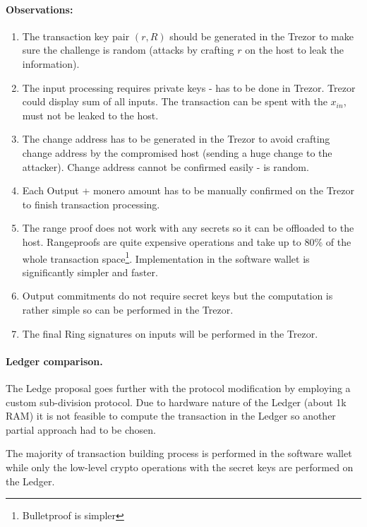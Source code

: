 \documentclass[]{article}
\begin{document}
\paragraph{Observations:}
\begin{enumerate}
	\item The transaction key pair $(r,R)$ should be generated in the Trezor to make sure the challenge is random (attacks by crafting $r$ on the host to leak the information). 
	
	\item The input processing requires private keys - has to be done in Trezor. Trezor could display sum of all inputs. The transaction can be spent with the $x_{in}$, must not be leaked to the host.
	
	\item The change address has to be generated in the Trezor to avoid crafting change address by the compromised host (sending a huge change to the attacker). Change address cannot be confirmed easily - is random.
	
	\item Each Output + monero amount has to be manually confirmed on the Trezor to finish transaction processing.
	
	\item The range proof does not work with any secrets so it can be offloaded to the host. Rangeproofs are quite expensive operations and take up to 80\% of the whole transaction space\footnote{Bulletproof is simpler}. Implementation in the software wallet is significantly simpler and faster.
	
	\item Output commitments do not require secret keys but the computation is rather simple so can be performed in the Trezor.
	
	\item The final Ring signatures on inputs will be performed in the Trezor.
\end{enumerate}

\paragraph{Ledger comparison.} The Ledge proposal \cite{ledger_doc} goes further with the protocol modification by employing a custom sub-division protocol. Due to hardware nature of the Ledger (about 1k RAM) it is not feasible to compute the transaction in the Ledger so another partial approach had to be chosen.

The majority of transaction building process is performed in the software wallet while only the low-level crypto operations with the secret keys are performed on the Ledger.  
\end{document}
